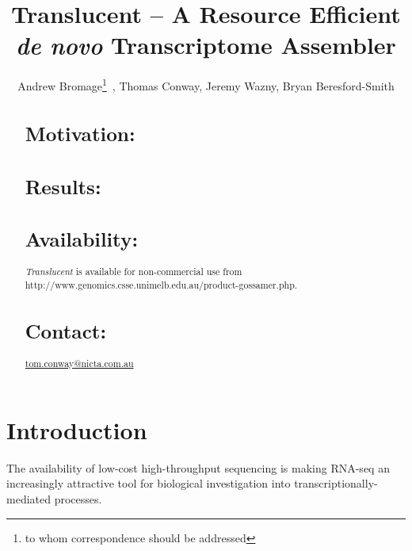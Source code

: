 \documentclass{bioinfo}
\def\Translucent{\textit{Translucent}}
\begin{document}

\title[Translucent]{Translucent -- A Resource Efficient {\em de novo} Transcriptome Assembler}
\author[Bromage \textit{et~al}]{Andrew Bromage\footnote{to whom correspondence should be addressed}\ ,
        Thomas Conway,
        Jeremy Wazny,
        Bryan Beresford-Smith
        }
\address{NICTA Victoria Research Laboratory, Department of Computer Science and Software Engineering, The University of Melbourne, Parkville, Australia\\
}





\maketitle

\begin{abstract}

\section{Motivation:}

\section{Results:}

\section{Availability:}
\Translucent{} is available for non-commercial use 
from http://www.genomics.csse.unimelb.edu.au/product-gossamer.php.

\section{Contact:} \href{tom.conway@nicta.com.au}{tom.conway@nicta.com.au}
\end{abstract}

\section{Introduction}

The availability of low-cost high-throughput sequencing is making
RNA-seq an increasingly attractive tool for biological investigation
into transcriptionally-mediated processes.
\end{document}
